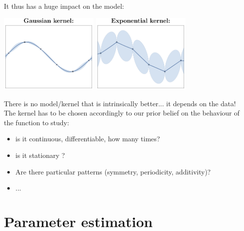 \documentclass{beamer}
\begin{document}
\begin{frame}{}
It thus has \alert{a huge impact on the model}:\\ 
\begin{center}
\includegraphics[height=3.9cm]{figures/R/Fig2-GP-rbf} \qquad 
\includegraphics[height=3.9cm]{figures/R/Fig2-GP-exp}
\end{center}
\end{frame}

\begin{frame}{}
There is no model/kernel that is intrinsically better... it depends on the data! \\
\vspace{5mm}
The kernel has to be chosen accordingly to our prior belief on the behaviour of the function to study:
\begin{itemize}
  \item is it continuous, differentiable, how many times?
  \item is it stationary ?
  \item Are there particular patterns (symmetry, periodicity, additivity)? 
  \item ...
\end{itemize}
\vspace{5mm}
\end{frame}


\section[Param Estim]{Parameter estimation}
\end{document}
